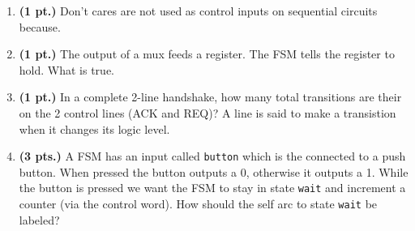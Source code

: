 \documentclass{article}
\begin{document}
\begin{enumerate}
\pagebreak
\item{\bf(1 pt.)} Don't cares are not used as control inputs on sequential
circuits because.

\item{\bf(1 pt.)} The output of a mux feeds a register.  The FSM tells the
register to hold.  What is true.

\item{\bf(1 pt.)} In a complete 2-line handshake, how many total transitions 
are their on the 2 control lines (ACK and REQ)?  A line is said to make a 
transistion when it changes its logic level.

\item {\bf (3 pts.)} 
A FSM has an input called \verb+button+ which is the connected to 
a push button.  When pressed the button outputs a 0, 
otherwise it outputs a 1.  While the button is pressed we want 
the FSM to stay in state \verb+wait+ and increment a counter 
(via the control word).  How should the self arc to state 
\verb+wait+ be labeled?


\end{enumerate}
\end{document}
